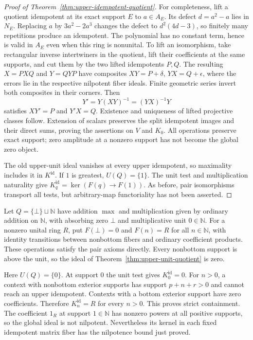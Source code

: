 \begin{proof}[Proof of Theorem~\ref{thm:upper-idempotent-quotient}]
For completeness, lift a quotient idempotent at its exact support
$E$ to $a\in A_E$. Its defect $d=a^2-a$ lies in $N_E$. Replacing
$a$ by $3a^2-2a^3$ changes the defect to $d^2(4d-3)$, so finitely
many repetitions produce an idempotent. The polynomial has no constant
term, hence is valid in $A_E$ even when this ring is nonunital.
To lift an isomorphism, take rectangular inverse intertwiners in the
quotient, lift their coefficients at the same supports, and cut them
by the two lifted idempotents $P,Q$. The resulting $X=PXQ$ and
$Y=QYP$ have composites $XY=P+\delta$, $YX=Q+\epsilon$, where the
errors lie in the respective nilpotent fiber ideals. Finite geometric
series invert both composites in their corners. Then
\[
 Y'=Y(XY)^{-1}=(YX)^{-1}Y
\]
satisfies $XY'=P$ and $Y'X=Q$. Existence and uniqueness of lifted
projective classes follow. Extension of scalars preserves the split
idempotent images and their direct sums, proving the assertions on
$V$ and $K_0$. All operations preserve exact support; zero amplitude
at a nonzero support has not become the global zero object.

The old upper-unit ideal vanishes at every upper idempotent, so
maximality includes it in $K^{\mathrm{id}}$. If $1$ is greatest,
$U(Q)=\{1\}$. The unit test and multiplication naturality give
$K^{\mathrm{id}}_q=\ker(F(q)\to F(1))$. As before, pair isomorphisms
transport all tests, but arbitrary-map functoriality has not been
asserted.
\end{proof}

\begin{example}
\label{ex:upper-idempotent-strict}
Let $Q=\{\bot\}\sqcup\mathbb N$ have addition $\max$ and
multiplication given by ordinary addition on $\mathbb N$, with
absorbing zero $\bot$ and multiplicative unit $0\in\mathbb N$.
For a nonzero unital ring $R$, put $F(\bot)=0$ and $F(n)=R$ for
all $n\in\mathbb N$, with identity transitions between nonbottom
fibers and ordinary coefficient products. These operations satisfy the
pair axioms directly. Every nonbottom support is above the unit, so
the ideal of Theorem~\ref{thm:upper-unit-quotient} is zero.

Here $U(Q)=\{0\}$. At support $0$ the unit test gives
$K^{\mathrm{id}}_0=0$. For $n>0$, a context with nonbottom exterior
supports has support $p+n+r>0$ and cannot reach an upper idempotent.
Contexts with a bottom exterior support have zero coefficients.
Therefore $K^{\mathrm{id}}_n=R$ for every $n>0$. This proves strict
containment. The coefficient $1_R$ at support $1\in\mathbb N$ has
nonzero powers at all positive supports, so the global ideal is not
nilpotent. Nevertheless its kernel in each fixed idempotent matrix
fiber has the nilpotence bound just proved.
\end{example}
